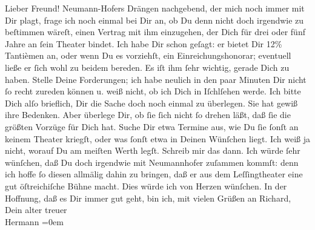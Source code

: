 \begin{ledgroupsized}[t]{13cm}
           \pstart\center{}Lieber Freund!\pend\pstart
           Neumann-Hofers Drängen nachgebend, der mich
               noch immer mit Dir plagt, frage ich noch einmal bei Dir an, ob Du denn nicht doch
               irgendwie zu beſtimmen wäreſt, einen Vertrag mit ihm einzugehen, der Dich für drei
               oder fünf Jahre an ſein Theater
               bindet. Ich habe Dir schon geſagt: er bietet Dir 12{\%}
               Tantièmen an, oder wenn Du es vorziehſt, ein Einreichungs{\pb}honorar; eventuell ließe er ſich wohl zu beidem
               bereden. Es iſt ihm ſehr wichtig, gerade Dich zu haben. Stelle Deine Forderungen; ich
               habe neulich in den paar Minuten Dir nicht ſo recht zureden können u. weiß nicht, ob
               ich Dich in Iſchlſehen werde. Ich bitte Dich
               alſo brieflich, Dir die Sache doch noch einmal zu überlegen. Sie hat gewiß ihre
               Bedenken. Aber überlege Dir, ob ſie ſich nicht ſo drehen läßt, daß ſie die größten
               Vorzüge für Dich hat. Suche Dir etwa Termine aus, wie Du ſie ſonſt an keinem Theater
                  {\pb}kriegſt, oder was ſonſt etwa in Deinen Wünſchen
               liegt. Ich weiß ja nicht, worauf Du am meiſten Werth legſt. Schreib mir das dann. Ich
               würde ſehr wünſchen, daß Du doch irgendwie mit Neumannhofer zuſammen kommſt: denn ich hoffe ſo diesen allmälig dahin zu
               bringen, daß er aus dem Leſſingtheater
               eine gut öſtreichiſche Bühne macht. Dies würde
               ich von Herzen wünſchen.\pend
           \pstart
           In der Hoffnung, daß es Dir immer gut geht, bin ich, mit vielen Grüßen {\pb}an Richard,\pend
           \pstart
           Dein alter treuer{\\[\baselineskip]}\spacefill\mbox{Hermann}\pend
           \leftskip=0em{}\pstart
           \textcolor{gray}{\textbf{\label{T_L00695_1v}}}
\end{ledgroupsized}
